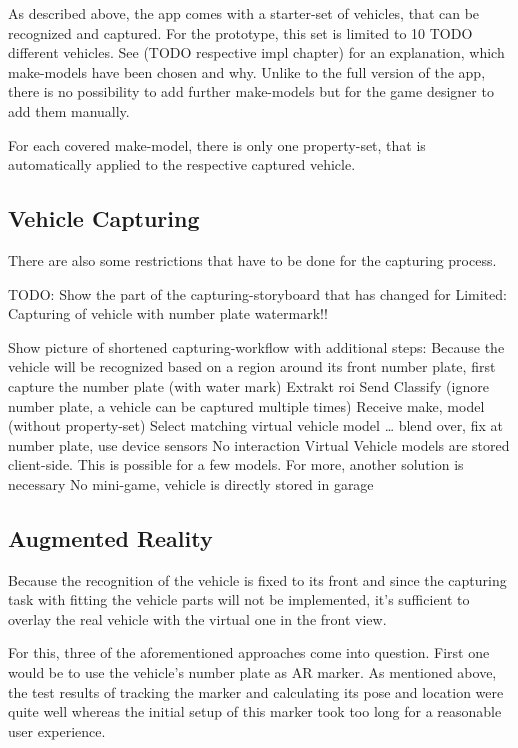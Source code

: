 As described above, the app comes with a starter-set of vehicles, that can be recognized and captured. For the prototype, this set is limited to 10 TODO different vehicles. See (TODO respective impl chapter) for an explanation, which make-models have been chosen and why. Unlike to the full version of the app, there is no possibility to add further make-models but for the game designer to add them manually.

For each covered make-model, there is only one property-set, that is automatically applied to the respective captured vehicle.

\subsection{Vehicle Capturing}
There are also some restrictions that have to be done for the capturing process.

TODO: Show the part of the capturing-storyboard that has changed for Limited: Capturing of vehicle with number plate watermark!!

Show picture of shortened capturing-workflow with additional steps:
Because the vehicle will be recognized based on a region around its front number plate, first capture the number plate (with water mark)
Extrakt roi
Send
Classify (ignore number plate, a vehicle can be captured multiple times)
Receive make, model (without property-set)
Select matching virtual vehicle model
… blend over, fix at number plate, use device sensors
No interaction
Virtual Vehicle models are stored client-side. This is possible for a few models. For more, another solution is necessary
No mini-game, vehicle is directly stored in garage

\subsection{Augmented Reality}
Because the recognition of the vehicle is fixed to its front and since the capturing task with fitting the vehicle parts will not be implemented, it’s sufficient to overlay the real vehicle with the virtual one in the front view.

For this, three of the aforementioned approaches come into question. First one would be to use the vehicle’s number plate as AR marker. As mentioned above, the test results of tracking the marker and calculating its pose and location were quite well whereas the initial setup of this marker took too long for a reasonable user experience.

